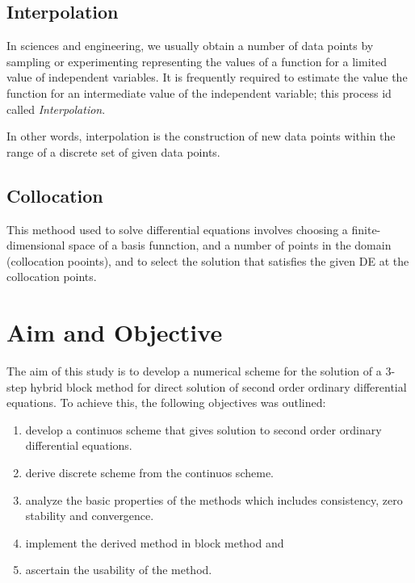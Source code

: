 \documentclass[12pt]{report}
\begin{document}
	\subsection{Interpolation}
	In sciences and engineering, we usually obtain a number of data points by sampling or experimenting representing the values of a function for a limited value of independent variables. It is frequently required to estimate the value the function for an intermediate value of the independent variable; this process id called \textsl{Interpolation}. 
	
	In other words, interpolation is the construction of new data points within the range of a discrete set of given data points.
	\subsection{Collocation}
	This methood used to solve differential equations involves choosing a finite-dimensional space of a basis funnction, and a number of points in the domain (collocation pooints), and to select the solution that satisfies the given DE at the collocation points.

\section*{Aim and Objective}
	The aim of this study is to develop a numerical scheme for the solution of a 3-step hybrid block method for direct solution of second order ordinary differential equations. To achieve this, the following objectives was outlined:
	\begin{enumerate}
		\item develop a continuos scheme that gives solution to second order ordinary differential equations.
		\item  derive discrete scheme from the continuos scheme.
		\item analyze the basic properties of the methods which includes consistency, zero stability and convergence.
		\item  implement the derived method in block method and
		\item  ascertain the usability of the method.
	\end{enumerate}

\end{document}
